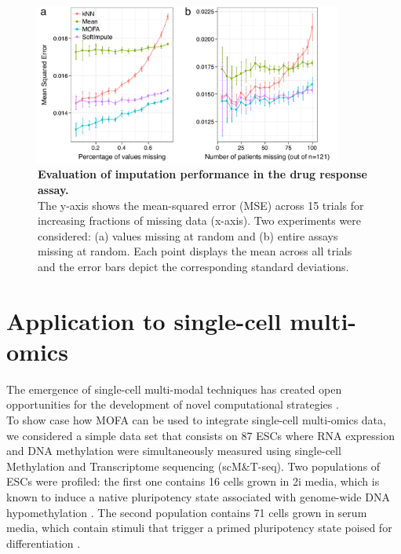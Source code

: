 \begin{figure}[H]
	\centering 	
	\includegraphics[width=0.9\textwidth]{MOFA_imputation}
	\caption{\textbf{Evaluation of imputation performance in the drug response assay.}\\
	The y-axis shows the mean-squared error (MSE) across 15 trials for increasing fractions of missing data (x-axis). Two experiments were considered: (a) values missing at random and (b) entire assays missing at random. Each point displays the mean across all trials and the error bars depict the corresponding standard deviations.}
	\label{fig:MOFA_imputation}
\end{figure}


\newpage

\section{Application to single-cell multi-omics} \label{section:mofa_scmt}

The emergence of single-cell multi-modal techniques has created open opportunities for the development of novel computational strategies \cite{Stuart2019,Colome-Tatche2018,Chappell2018}.\\
To show case how MOFA can be used to integrate single-cell multi-omics data, we considered a simple data set that consists on 87 ESCs where RNA expression and DNA methylation were simultaneously measured using single-cell Methylation and Transcriptome sequencing (scM\&T-seq)\cite{Angermueller2016}. Two populations of ESCs were profiled: the first one contains 16 cells grown in 2i media, which is known to induce a native pluripotency state associated with genome-wide DNA hypomethylation \cite{Ficz2013}. The second population contains 71 cells grown in serum media, which contain stimuli that trigger a primed pluripotency state poised for differentiation \cite{Tosolini2016}.

